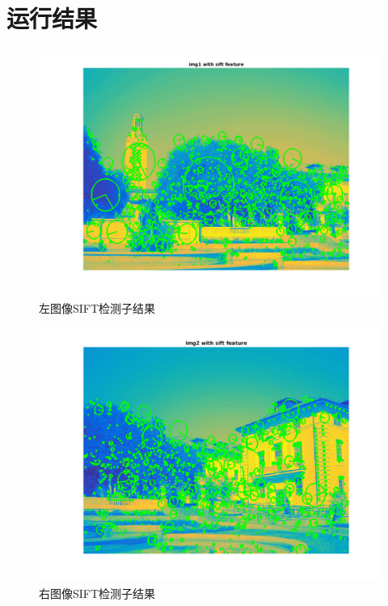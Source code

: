 \documentclass[a4paper, UTF8]{ctexrep}
\begin{document}
	\section{运行结果}
	\clearpage
		\begin{figure}[htbp!]
			\centering
			\includegraphics[width = \textwidth]{hw2_fig1.png}
			\caption{左图像SIFT检测子结果}
			\label{fig:figure1}
		\end{figure}
		\clearpage
		\begin{figure}[htbp!]
			\centering
			\includegraphics[width = \textwidth]{hw2_fig2.png}
			\caption{右图像SIFT检测子结果}
			\label{fig:figure1}
		\end{figure}
		\clearpage
\end{document}
